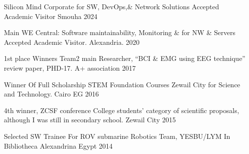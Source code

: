 


\begin{cvhonors}

  \cvhonor
    {Silicon Mind Corporate for SW, DevOps,\& Network Solutions} %
    {Accepted Academic Visitor} %
    {Smouha} %
    {2024} %

  \cvhonor
    {Main WE Central: Software maintainability, Monitoring \& for NW \& Servers} %
    {Accepted Academic Visitor.} %
    { Alexandria.} %
    {2020} %


  \cvhonor
    { 1st place Winners} %
    {Team2 main Researcher, “BCI \& EMG using EEG technique” review paper, PHD-17.} %
    {A+ association} %
    {2017} %


  \cvhonor
  {Winner Of Full Scholarship STEM Foundation Courses } %
  {Zewail City for Science and Technology.} %
  {Cairo EG} %
  {2016} %

  \cvhonor
  {4th winner, ZCSF conference } %
  {\scriptsize College students’ category of scientific proposals, although I was still in secondary school.} %
  {Zewail City} %
  {2015} %

    \cvhonor
      {Selected SW Trainee For ROV submarine Robotics Team, } %
      {YESBU/LYM In Bibliotheca Alexandrina} %
      {Egypt} %
      {2014} %

\end{cvhonors}